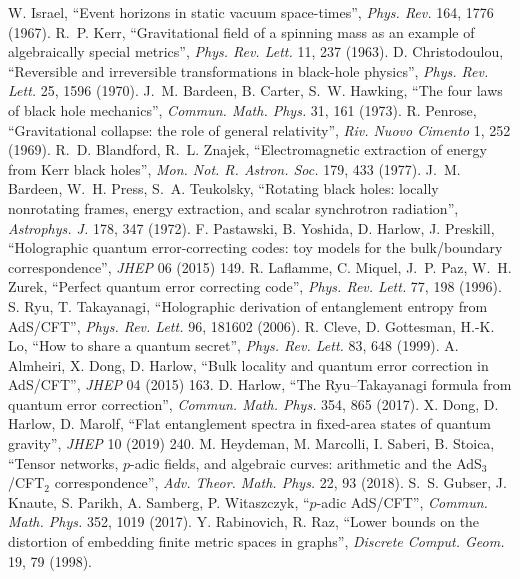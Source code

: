  W. Israel, ``Event horizons in static vacuum space-times'', \emph{Phys. Rev.} 164, 1776 (1967).
 R.~P. Kerr, ``Gravitational field of a spinning mass as an example of algebraically special metrics'', \emph{Phys. Rev.
Lett.} 11, 237 (1963).
 D. Christodoulou, ``Reversible and irreversible transformations in black-hole physics'', \emph{Phys. Rev. Lett.}
25, 1596 (1970).
 J.~M. Bardeen, B. Carter, S.~W. Hawking, ``The four laws of black hole mechanics'', \emph{Commun. Math. Phys.} 31, 161
(1973).
 R. Penrose, ``Gravitational collapse: the role of general relativity'', \emph{Riv. Nuovo Cimento} 1, 252 (1969).
 R.~D. Blandford, R.~L. Znajek, ``Electromagnetic extraction of energy from Kerr black holes'', \emph{Mon. Not. R. Astron.
Soc.} 179, 433 (1977).
 J.~M. Bardeen, W.~H. Press, S.~A. Teukolsky, ``Rotating black holes: locally nonrotating frames, energy extraction, and
scalar synchrotron radiation'', \emph{Astrophys. J.} 178, 347 (1972).
 F. Pastawski, B. Yoshida, D. Harlow, J. Preskill, ``Holographic quantum error-correcting codes: toy models for the
bulk/boundary correspondence'', \emph{JHEP} 06 (2015) 149.
 R. Laflamme, C. Miquel, J.~P. Paz, W.~H. Zurek, ``Perfect quantum error correcting code'', \emph{Phys. Rev. Lett.}
77, 198 (1996).
 S. Ryu, T. Takayanagi, ``Holographic derivation of entanglement entropy from AdS/CFT'', \emph{Phys. Rev. Lett.} 96, 181602
(2006).
 R. Cleve, D. Gottesman, H.-K. Lo, ``How to share a quantum secret'', \emph{Phys. Rev. Lett.} 83, 648 (1999).
 A. Almheiri, X. Dong, D. Harlow, ``Bulk locality and quantum error correction in AdS/CFT'', \emph{JHEP} 04 (2015) 163.
 D. Harlow, ``The Ryu--Takayanagi formula from quantum error correction'', \emph{Commun. Math. Phys.} 354, 865 (2017).
 X. Dong, D. Harlow, D. Marolf, ``Flat entanglement spectra in fixed-area states of quantum gravity'', \emph{JHEP} 10
(2019) 240.
 M. Heydeman, M. Marcolli, I. Saberi, B. Stoica, ``Tensor networks, $p$-adic fields, and algebraic curves: arithmetic and
the AdS$_3$/CFT$_2$ correspondence'', \emph{Adv. Theor. Math. Phys.} 22, 93 (2018).
 S.~S. Gubser, J. Knaute, S. Parikh, A. Samberg, P. Witaszczyk, ``$p$-adic AdS/CFT'', \emph{Commun. Math. Phys.} 352,
1019 (2017).
 Y. Rabinovich, R. Raz, ``Lower bounds on the distortion of embedding finite metric spaces in graphs'', \emph{Discrete
Comput. Geom.} 19, 79 (1998).
